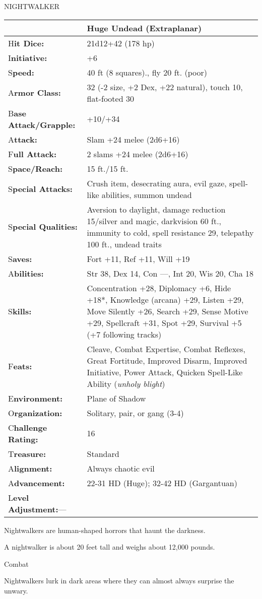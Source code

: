 \documentclass{article}
\begin{document}
\vspace{12pt}
NIGHTWALKER

\begin{tabular}{|>{\raggedright}p{87pt}|>{\raggedright}p{239pt}|}
\hline
  & Huge Undead (Extraplanar)\tabularnewline
\hline
H\textbf{it Dice:} & 21d12+42 (178 hp)\tabularnewline
\hline
I\textbf{nitiative:} & +6\tabularnewline
\hline
S\textbf{peed:} & 40 ft (8 squares)., fly 20 ft. (poor)\tabularnewline
\hline
A\textbf{rmor Class:} & 32 (-2 size, +2 Dex, +22 natural), touch 10, flat-footed 
30\tabularnewline
\hline
B\textbf{ase Attack/Grapple:} & +10/+34\tabularnewline
\hline
A\textbf{ttack:} & Slam +24 melee (2d6+16)\tabularnewline
\hline
F\textbf{ull Attack:} & 2 slams +24 melee (2d6+16)\tabularnewline
\hline
S\textbf{pace/Reach:} & 15 ft./15 ft.\tabularnewline
\hline
S\textbf{pecial Attacks:} & Crush item, desecrating aura, evil gaze, spell-like 
abilities, summon undead\tabularnewline
\hline
S\textbf{pecial Qualities:} & Aversion to daylight, damage reduction 15/silver 
and magic, darkvision 60 ft., immunity to cold, spell resistance 29, telepathy 
100 ft., undead traits\tabularnewline
\hline
S\textbf{aves:} & Fort +11, Ref +11, Will +19\tabularnewline
\hline
A\textbf{bilities:} & Str 38, Dex 14, Con ---, Int 20, Wis 20, Cha 18\tabularnewline
\hline
S\textbf{kills:} & Concentration +28, Diplomacy +6, Hide +18*, Knowledge (arcana) 
+29, Listen +29, Move Silently +26, Search +29, Sense Motive +29, Spellcraft +31, 
Spot +29, Survival +5 (+7 following tracks)\tabularnewline
\hline
F\textbf{eats:} & Cleave, Combat Expertise, Combat Reflexes, Great Fortitude, Improved 
Disarm, Improved Initiative, Power Attack, Quicken Spell-Like Ability (\textit{unholy 
blight})\tabularnewline
\hline
E\textbf{nvironment:} & Plane of Shadow\tabularnewline
\hline
O\textbf{rganization:} & Solitary, pair, or gang (3-4)\tabularnewline
\hline
C\textbf{hallenge Rating:} & 16\tabularnewline
\hline
T\textbf{reasure:} & Standard\tabularnewline
\hline
A\textbf{lignment:} & Always chaotic evil\tabularnewline
\hline
A\textbf{dvancement:} & 22-31 HD (Huge); 32-42 HD (Gargantuan)\tabularnewline
\hline
L\textbf{evel Adjustment:}--- & \tabularnewline
\hline
\end{tabular}

Nightwalkers are human-shaped horrors that haunt the darkness.

A nightwalker is about 20 feet tall and weighs about 12,000 pounds.

Combat

Nightwalkers lurk in dark areas where they can almost always surprise the unwary.
\end{document}

